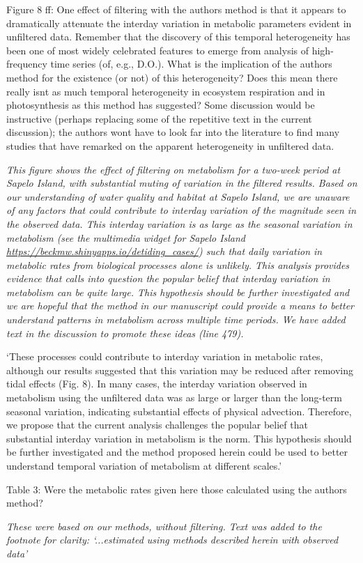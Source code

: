 \documentclass[letterpaper,12pt]{article}\usepackage[]{graphicx}\usepackage[]{color}
\begin{document}
Figure 8 ff: One effect of filtering with the authors method is that it appears to dramatically attenuate the interday variation in metabolic parameters evident in unfiltered data. Remember that the discovery of this temporal heterogeneity has been one of most widely celebrated features to emerge from analysis of high-frequency time series (of, e.g., D.O.). What is the implication of the authors method for the existence (or not) of this heterogeneity? Does this mean there really isnt as much temporal heterogeneity in ecosystem respiration and in photosynthesis as this method has suggested? Some discussion would be instructive (perhaps
replacing some of the repetitive text in the current discussion); the authors wont have to look far into the literature to find many studies that have remarked on the apparent heterogeneity in unfiltered data.

{\it This figure shows the effect of filtering on metabolism for a two-week period at Sapelo Island, with substantial muting of variation in the filtered results.  Based on our understanding of water quality and habitat at Sapelo Island, we are unaware of any factors that could contribute to interday variation of the magnitude seen in the observed data.  This interday variation is as large as the seasonal variation in metabolism (see the multimedia widget for Sapelo Island  \href{https://beckmw.shinyapps.io/detiding_cases/}{https://beckmw.shinyapps.io/detiding\_cases/}) such that daily variation in metabolic rates from biological processes alone is unlikely.  This analysis provides evidence that calls into question the popular belief that interday variation in metabolism can be quite large.  This hypothesis should be further investigated and we are hopeful that the method in our manuscript could provide a means to better understand patterns in metabolism across multiple time periods.  We have added text in the discussion to promote these ideas (line 479).    

`These processes could contribute to interday variation in metabolic rates, although our results suggested that this variation may be reduced after removing tidal effects (Fig. 8).  In many cases, the interday variation observed in metabolism using the unfiltered data was as large or larger than the long-term seasonal variation, indicating substantial effects of physical advection.  Therefore, we propose that the current analysis challenges the popular belief that substantial interday variation in metabolism is the norm.  This hypothesis should be further investigated and the method proposed herein could be used to better understand temporal variation of metabolism at different scales.'}

Table 3: Were the metabolic rates given here those calculated using the authors method?

{\it These were based on our methods, without filtering.  Text was added to the footnote for clarity: `...estimated using methods described herein with observed data'}
\end{document}
